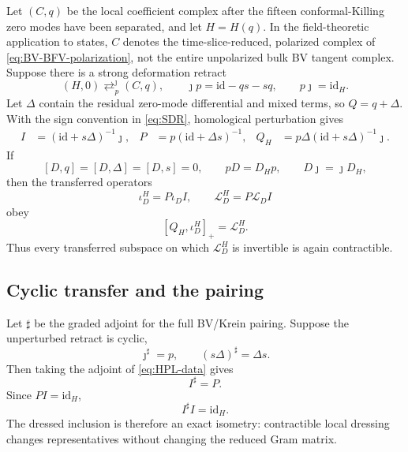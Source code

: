 \documentclass[11pt]{article}
\theoremstyle{definition}
\theoremstyle{remark}
\newcommand{\cL}{\mathcal L}
\newcommand{\id}{\mathrm{id}}
\begin{document}
Let $(C,q)$ be the local coefficient complex after the fifteen
conformal-Killing zero modes have been separated, and let $H=H(q)$.  In the
field-theoretic application to states, $C$ denotes the time-slice-reduced,
polarized complex of \eqref{eq:BV-BFV-polarization}, not the entire
unpolarized bulk BV tangent complex.  Suppose
there is a strong deformation retract
\begin{equation}\label{eq:SDR}
 (H,0)\mathrel{\mathop{\rightleftarrows}^{\jmath}_{p}}(C,q),
 \qquad
 \jmath p=\id-qs-sq,
 \qquad p\jmath=\id_H.
\end{equation}
Let $\Delta$ contain the residual zero-mode differential and mixed terms, so
$Q=q+\Delta$.  With the sign convention in \eqref{eq:SDR}, homological
perturbation gives
\begin{align}\label{eq:HPL-data}
 I&=(\id+s\Delta)^{-1}\jmath,
 &P&=p(\id+\Delta s)^{-1},
 &Q_H&=p\Delta(\id+s\Delta)^{-1}\jmath.
\end{align}
If
\begin{equation}\label{eq:D-equivariance}
 [D,q]=[D,\Delta]=[D,s]=0,
 \qquad pD=D_Hp,
 \qquad D\jmath=\jmath D_H,
\end{equation}
then the transferred operators
\begin{equation}
 \iota_D^H=P\iota_DI,
 \qquad \cL_D^H=P\cL_DI
\end{equation}
obey
\begin{equation}\label{eq:transferred-Cartan}
 [Q_H,\iota_D^H]_+=\cL_D^H.
\end{equation}
Thus every transferred subspace on which $\cL_D^H$ is invertible is again
contractible.

\subsection{Cyclic transfer and the pairing}

Let $\sharp$ be the graded adjoint for the full BV/Krein pairing.  Suppose
the unperturbed retract is cyclic,
\begin{equation}\label{eq:cyclic-SDR}
 \jmath^\sharp=p,
 \qquad (s\Delta)^\sharp=\Delta s.
\end{equation}
Then taking the adjoint of \eqref{eq:HPL-data} gives
\begin{equation}
 I^\sharp=P.
\end{equation}
Since $PI=\id_H$,
\begin{equation}\label{eq:HPL-isometry}
 \boxed{I^\sharp I=\id_H.}
\end{equation}
The dressed inclusion is therefore an exact isometry: contractible local
dressing changes representatives without changing the reduced Gram matrix.
\end{document}
